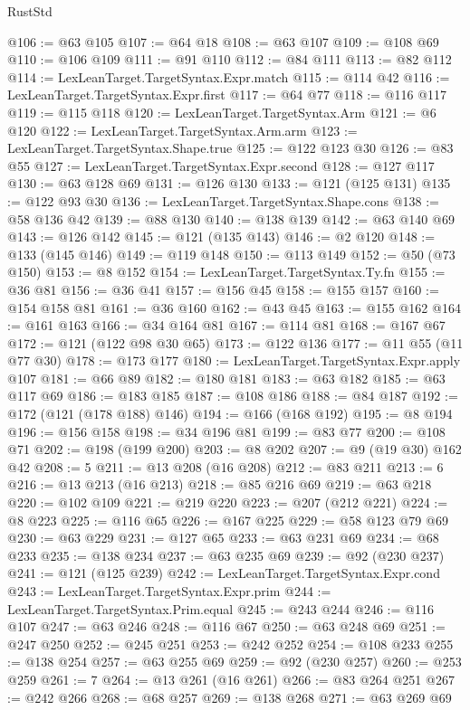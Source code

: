 \begin{lexlean}{RustStd}
\begin{coremodule}
@106 := @63 @105
@107 := @64 @18
@108 := @63 @107
@109 := @108 @69
@110 := @106 @109
@111 := @91 @110
@112 := @84 @111
@113 := @82 @112
@114 := LexLeanTarget.TargetSyntax.Expr.match
@115 := @114 @42
@116 := LexLeanTarget.TargetSyntax.Expr.first
@117 := @64 @77
@118 := @116 @117
@119 := @115 @118
@120 := LexLeanTarget.TargetSyntax.Arm
@121 := @6 @120
@122 := LexLeanTarget.TargetSyntax.Arm.arm
@123 := LexLeanTarget.TargetSyntax.Shape.true
@125 := @122 @123 @30
@126 := @83 @55
@127 := LexLeanTarget.TargetSyntax.Expr.second
@128 := @127 @117
@130 := @63 @128 @69
@131 := @126 @130
@133 := @121 (@125 @131)
@135 := @122 @93 @30
@136 := LexLeanTarget.TargetSyntax.Shape.cons
@138 := @58 @136 @42
@139 := @88 @130
@140 := @138 @139
@142 := @63 @140 @69
@143 := @126 @142
@145 := @121 (@135 @143)
@146 := @2 @120
@148 := @133 (@145 @146)
@149 := @119 @148
@150 := @113 @149
@152 := @50 (@73 @150)
@153 := @8 @152
@154 := LexLeanTarget.TargetSyntax.Ty.fn
@155 := @36 @81
@156 := @36 @41
@157 := @156 @45
@158 := @155 @157
@160 := @154 @158 @81
@161 := @36 @160
@162 := @43 @45
@163 := @155 @162
@164 := @161 @163
@166 := @34 @164 @81
@167 := @114 @81
@168 := @167 @67
@172 := @121 (@122 @98 @30 @65)
@173 := @122 @136
@177 := @11 @55 (@11 @77 @30)
@178 := @173 @177
@180 := LexLeanTarget.TargetSyntax.Expr.apply @107
@181 := @66 @89
@182 := @180 @181
@183 := @63 @182
@185 := @63 @117 @69
@186 := @183 @185
@187 := @108 @186
@188 := @84 @187
@192 := @172 (@121 (@178 @188) @146)
@194 := @166 (@168 @192)
@195 := @8 @194
@196 := @156 @158
@198 := @34 @196 @81
@199 := @83 @77
@200 := @108 @71
@202 := @198 (@199 @200)
@203 := @8 @202
@207 := @9 (@19 @30) @162 @42
@208 := 5
@211 := @13 @208 (@16 @208)
@212 := @83 @211
@213 := 6
@216 := @13 @213 (@16 @213)
@218 := @85 @216 @69
@219 := @63 @218
@220 := @102 @109
@221 := @219 @220
@223 := @207 (@212 @221)
@224 := @8 @223
@225 := @116 @65
@226 := @167 @225
@229 := @58 @123 @79 @69
@230 := @63 @229
@231 := @127 @65
@233 := @63 @231 @69
@234 := @68 @233
@235 := @138 @234
@237 := @63 @235 @69
@239 := @92 (@230 @237)
@241 := @121 (@125 @239)
@242 := LexLeanTarget.TargetSyntax.Expr.cond
@243 := LexLeanTarget.TargetSyntax.Expr.prim
@244 := LexLeanTarget.TargetSyntax.Prim.equal
@245 := @243 @244
@246 := @116 @107
@247 := @63 @246
@248 := @116 @67
@250 := @63 @248 @69
@251 := @247 @250
@252 := @245 @251
@253 := @242 @252
@254 := @108 @233
@255 := @138 @254
@257 := @63 @255 @69
@259 := @92 (@230 @257)
@260 := @253 @259
@261 := 7
@264 := @13 @261 (@16 @261)
@266 := @83 @264 @251
@267 := @242 @266
@268 := @68 @257
@269 := @138 @268
@271 := @63 @269 @69

\end{coremodule}
\end{lexlean}

